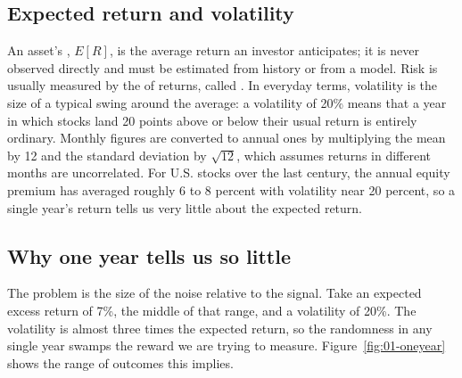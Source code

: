 \subsection{Expected return and volatility}
\label{sec:01-expret}

An asset's , $E[R]$, is the average return an investor anticipates; it is never observed directly and must be estimated from history or from a model. Risk is usually measured by the  of returns, called . In everyday terms, volatility is the size of a typical swing around the average: a volatility of 20\% means that a year in which stocks land 20 points above or below their usual return is entirely ordinary. Monthly figures are converted to annual ones by multiplying the mean by 12 and the standard deviation by $\sqrt{12}$, which assumes returns in different months are uncorrelated. For U.S. stocks over the last century, the annual equity premium has averaged roughly 6 to 8 percent with volatility near 20 percent, so a single year's return tells us very little about the expected return.

\subsection{Why one year tells us so little}

The problem is the size of the noise relative to the signal. Take an expected excess return of 7\%, the middle of that range, and a volatility of 20\%. The volatility is almost three times the expected return, so the randomness in any single year swamps the reward we are trying to measure. Figure~\ref{fig:01-oneyear} shows the range of outcomes this implies.

